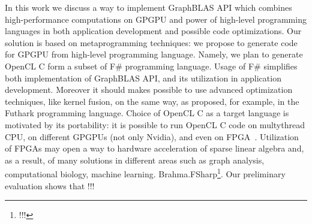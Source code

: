 In this work we discuss a way to implement GraphBLAS API which combines high-performance computations on GPGPU and power of high-level programming languages in both application development and possible code optimizations.
Our solution is based on metaprogramming techniques: we propose to generate code for GPGPU from high-level programming language.
Namely, we plan to generate OpenCL C form a subset of  F\# programming language.
Usage of F\# simplifies both implementation of GraphBLAS API, and its utilization in application development. 
Moreover it should makes possible to use advanced optimization techniques, like kernel fusion, on the same way, as proposed, for example, in the Futhark programming language.
Choice of OpenCL C as a target language is motivated by its portability: it is possible to run OpenCL C code on multythread CPU, on different GPGPUs (not only Nvidia), and even on FPGA~\cite{kenter2019invited, 6567546}.
Utilization of FPGAs may open a way to hardware acceleration of sparse linear algebra and, as a result, of many solutions in different areas such as graph analysis, computational biology, machine learning.
Brahma.FSharp\footnote{!!!}.
Our preliminary evaluation shows that !!!
